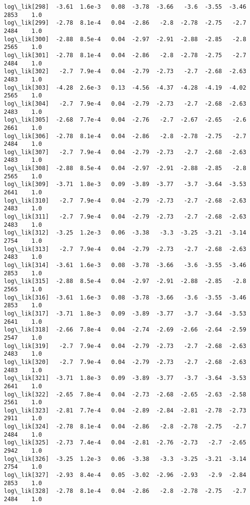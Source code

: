 \documentclass[11pt]{article}
\begin{document}
\begin{Verbatim}[commandchars=\\\{\}]
log\_lik[298]  -3.61  1.6e-3   0.08  -3.78  -3.66   -3.6  -3.55  -3.46   2853    1.0
log\_lik[299]  -2.78  8.1e-4   0.04  -2.86   -2.8  -2.78  -2.75   -2.7   2484    1.0
log\_lik[300]  -2.88  8.5e-4   0.04  -2.97  -2.91  -2.88  -2.85   -2.8   2565    1.0
log\_lik[301]  -2.78  8.1e-4   0.04  -2.86   -2.8  -2.78  -2.75   -2.7   2484    1.0
log\_lik[302]   -2.7  7.9e-4   0.04  -2.79  -2.73   -2.7  -2.68  -2.63   2483    1.0
log\_lik[303]  -4.28  2.6e-3   0.13  -4.56  -4.37  -4.28  -4.19  -4.02   2565    1.0
log\_lik[304]   -2.7  7.9e-4   0.04  -2.79  -2.73   -2.7  -2.68  -2.63   2483    1.0
log\_lik[305]  -2.68  7.7e-4   0.04  -2.76   -2.7  -2.67  -2.65   -2.6   2661    1.0
log\_lik[306]  -2.78  8.1e-4   0.04  -2.86   -2.8  -2.78  -2.75   -2.7   2484    1.0
log\_lik[307]   -2.7  7.9e-4   0.04  -2.79  -2.73   -2.7  -2.68  -2.63   2483    1.0
log\_lik[308]  -2.88  8.5e-4   0.04  -2.97  -2.91  -2.88  -2.85   -2.8   2565    1.0
log\_lik[309]  -3.71  1.8e-3   0.09  -3.89  -3.77   -3.7  -3.64  -3.53   2641    1.0
log\_lik[310]   -2.7  7.9e-4   0.04  -2.79  -2.73   -2.7  -2.68  -2.63   2483    1.0
log\_lik[311]   -2.7  7.9e-4   0.04  -2.79  -2.73   -2.7  -2.68  -2.63   2483    1.0
log\_lik[312]  -3.25  1.2e-3   0.06  -3.38   -3.3  -3.25  -3.21  -3.14   2754    1.0
log\_lik[313]   -2.7  7.9e-4   0.04  -2.79  -2.73   -2.7  -2.68  -2.63   2483    1.0
log\_lik[314]  -3.61  1.6e-3   0.08  -3.78  -3.66   -3.6  -3.55  -3.46   2853    1.0
log\_lik[315]  -2.88  8.5e-4   0.04  -2.97  -2.91  -2.88  -2.85   -2.8   2565    1.0
log\_lik[316]  -3.61  1.6e-3   0.08  -3.78  -3.66   -3.6  -3.55  -3.46   2853    1.0
log\_lik[317]  -3.71  1.8e-3   0.09  -3.89  -3.77   -3.7  -3.64  -3.53   2641    1.0
log\_lik[318]  -2.66  7.8e-4   0.04  -2.74  -2.69  -2.66  -2.64  -2.59   2547    1.0
log\_lik[319]   -2.7  7.9e-4   0.04  -2.79  -2.73   -2.7  -2.68  -2.63   2483    1.0
log\_lik[320]   -2.7  7.9e-4   0.04  -2.79  -2.73   -2.7  -2.68  -2.63   2483    1.0
log\_lik[321]  -3.71  1.8e-3   0.09  -3.89  -3.77   -3.7  -3.64  -3.53   2641    1.0
log\_lik[322]  -2.65  7.8e-4   0.04  -2.73  -2.68  -2.65  -2.63  -2.58   2561    1.0
log\_lik[323]  -2.81  7.7e-4   0.04  -2.89  -2.84  -2.81  -2.78  -2.73   2911    1.0
log\_lik[324]  -2.78  8.1e-4   0.04  -2.86   -2.8  -2.78  -2.75   -2.7   2484    1.0
log\_lik[325]  -2.73  7.4e-4   0.04  -2.81  -2.76  -2.73   -2.7  -2.65   2942    1.0
log\_lik[326]  -3.25  1.2e-3   0.06  -3.38   -3.3  -3.25  -3.21  -3.14   2754    1.0
log\_lik[327]  -2.93  8.4e-4   0.05  -3.02  -2.96  -2.93   -2.9  -2.84   2853    1.0
log\_lik[328]  -2.78  8.1e-4   0.04  -2.86   -2.8  -2.78  -2.75   -2.7   2484    1.0

\end{Verbatim}
\end{document}
